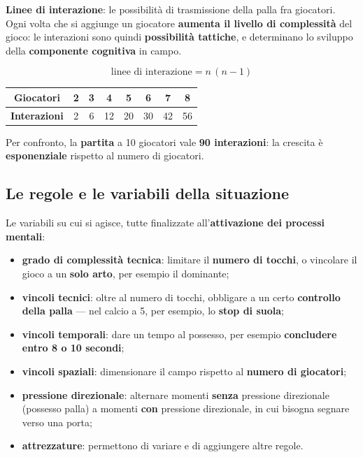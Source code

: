 \textbf{Linee di interazione}: le possibilità di trasmissione della palla fra giocatori. Ogni volta
che si aggiunge un giocatore \textbf{aumenta il livello di complessità} del gioco: le interazioni
sono quindi \textbf{possibilità tattiche}, e determinano lo sviluppo della \textbf{componente
cognitiva} in campo.

\[
  \text{linee di interazione} = n\,(n-1)
\]

\begin{table}[htbp]
  \centering
  \small
  \renewcommand{\arraystretch}{1.3}
  \begin{tabular}{|c|c|c|c|c|c|c|c|}
    \hline
    \textbf{Giocatori} & 2 & 3 & 4 & 5 & 6 & 7 & 8 \\
    \hline
    \textbf{Interazioni} & 2 & 6 & 12 & 20 & 30 & 42 & 56 \\
    \hline
  \end{tabular}
\end{table}

Per confronto, la \textbf{partita} a 10 giocatori vale \textbf{90 interazioni}: la crescita è
\textbf{esponenziale} rispetto al numero di giocatori.

\subsection{Le regole e le variabili della situazione}

Le variabili su cui si agisce, tutte finalizzate all'\textbf{attivazione dei processi mentali}:

\begin{itemize}
  \item \textbf{grado di complessità tecnica}: limitare il \textbf{numero di tocchi}, o vincolare il
    gioco a un \textbf{solo arto}, per esempio il dominante;
  \item \textbf{vincoli tecnici}: oltre al numero di tocchi, obbligare a un certo \textbf{controllo
    della palla} --- nel calcio a 5, per esempio, lo \textbf{stop di suola};
  \item \textbf{vincoli temporali}: dare un tempo al possesso, per esempio \textbf{concludere entro
    8 o 10 secondi};
  \item \textbf{vincoli spaziali}: dimensionare il campo rispetto al \textbf{numero di giocatori};
  \item \textbf{pressione direzionale}: alternare momenti \textbf{senza} pressione direzionale
    (possesso palla) a momenti \textbf{con} pressione direzionale, in cui bisogna segnare verso una
    porta;
  \item \textbf{attrezzature}: permettono di variare e di aggiungere altre regole.
\end{itemize}

